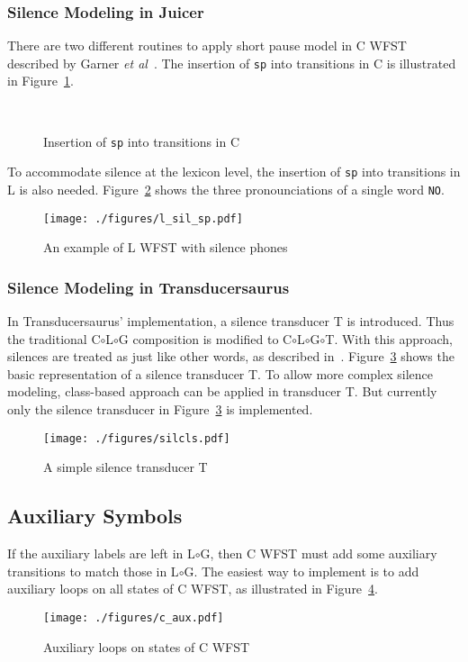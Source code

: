 \subsubsection{Silence Modeling in Juicer}
\label{juicer_sil}

There are two different routines to apply short pause model in C WFST described by Garner \textit{et al}~\cite{garner2008silence}. The insertion of \texttt{sp} into transitions in C is illustrated in Figure~\ref{c_sp_model}.

\begin{figure}[!ht] 
  \centering
   ~
   ~
  \caption{Insertion of \texttt{sp} into transitions in C}
  \label{c_sp_model}
\end{figure}

To accommodate silence at the lexicon level, the insertion of \texttt{sp} into transitions in L is also needed. Figure~\ref{l_sil_sp} shows the three pronounciations of a single word \texttt{NO}.

\begin{figure}[H]
  \centering
  \texttt{[image: ./figures/l\_sil\_sp.pdf]}
  \caption{An example of L WFST with silence phones}
  \label{l_sil_sp}
\end{figure}

\subsubsection{Silence Modeling in Transducersaurus}
\label{josef_sil}
In Transducersaurus' implementation, a silence transducer T is introduced. Thus the traditional C$\circ{}$L$\circ{}$G composition is modified to C$\circ{}$L$\circ{}$G$\circ{}$T. With this approach, silences are treated as just like other words, as described in~\cite{allauzen2004generalized}. Figure~\ref{silcls} shows the basic representation of a silence transducer T. To allow more complex silence modeling, class-based approach can be applied in transducer T. But currently only the silence transducer in Figure~\ref{silcls} is implemented.

\begin{figure}[H]
  \centering
  \texttt{[image: ./figures/silcls.pdf]}
  \caption{A simple silence transducer T}
  \label{silcls}
\end{figure}

\subsection{Auxiliary Symbols}
\label{cdaux}
If the auxiliary labels are left in L$\circ$G, then C WFST must add some auxiliary transitions to match those in L$\circ$G. The easiest way to implement is to add auxiliary loops on all states of C WFST, as illustrated in Figure~\ref{c_aux}. 

\begin{figure}[H]
  \centering
  \texttt{[image: ./figures/c\_aux.pdf]}
  \caption{Auxiliary loops on states of C WFST}
  \label{c_aux}
\end{figure}